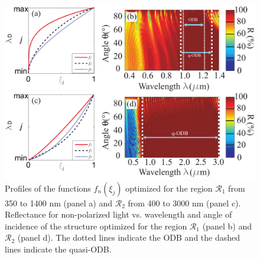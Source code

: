 \documentclass[a4paper,fleqn]{cas-sc}
\begin{document}
\begin{figure}
        \begin{center}
                \includegraphics[width=\textwidth]{F1Alternativa.pdf}
        \end{center}
        \caption{Profiles of the functions $f_n(\xi_j)$ optimized for
                the region $\mathcal R_1$ from 350 to 1400 nm (panel a) and
                $\mathcal R_2$ from 400 to 3000 nm (panel c). Reflectance
                for non-polarized light
                vs. wavelength and angle of incidence of the structure
                optimized for the region $\mathcal R_1$ (panel b) and
                $\mathcal R_2$ (panel d). The dotted lines
                indicate the ODB and the dashed lines
                indicate the quasi-ODB.}
        \label{Fig1}
\end{figure}
\end{document}

